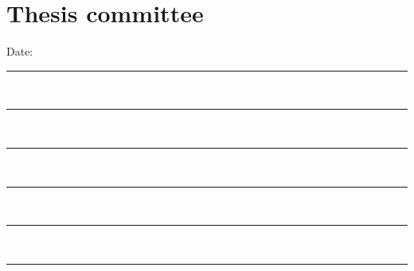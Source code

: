 

\chapter*{Thesis committee}
\vfill
\hfill Date: \graduationDate{} \\
\vspace{15mm}
\rule{\textwidth}{0.3mm} \\
\vspace{15mm}
\rule{\textwidth}{0.3mm} \\
\vspace{15mm}
\rule{\textwidth}{0.3mm} \\
\vspace{15mm}
\rule{\textwidth}{0.3mm} \\
\vspace{15mm}
\rule{\textwidth}{0.3mm} \\
\vspace{15mm}
\rule{\textwidth}{0.3mm} \\
\cleardoublepage
